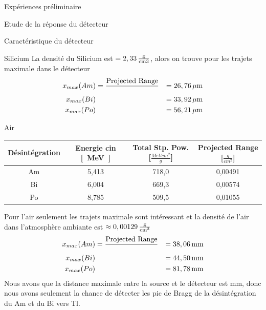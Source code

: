 \documentclass[a4paper,11pt,liststotocnumbered,bibtotocnumbered]{scrartcl}
\begin{document}
\begin{section}{Expériences préliminaire}
\begin{subsection}{Etude de la réponse du détecteur}
\begin{subsubsection}{Caractéristique du détecteur}
\begin{paragraph}{Silicium}
    La densité du Silicium \cite{wikisi} est $\rho=\unit[2,33]{\frac{g}{cm3}}$, alors on trouve pour les trajets maximale dans le détecteur
    \begin{eqnarray*}
     x_{max}(Am)&=\frac{\text{Projected Range}}{\rho}&=\unit[26,76]{\mu m}\\
     x_{max}(Bi)&&=\unit[33,92]{\mu m}\\
     x_{max}(Po)&&=\unit[56,21]{\mu m}
    \end{eqnarray*}
   \end{paragraph}
   \begin{paragraph}{Air}
    \begin{center}
     \begin{tabular}{c|c|c|c}
      Désintégration & Energie cin \unit{[MeV]} & Total Stp. Pow. [$\frac{MeV cm^2}{g}$] & Projected Range [$\frac{g}{cm^2}$] \\ \hline
      Am & 5,413 & 718,0 & 0,00491 \\ 
      Bi & 6,004 & 669,3 & 0,00574 \\ 
      Po & 8,785 & 509,5 & 0,01055 \\ 
     \end{tabular}
    \end{center}
    Pour l'air seulement les trajets maximale sont intéressant et la densité de l'air dans l'atmosphère ambiante est $\rho\approx\unit[0,00129]{\frac{g}{cm^3}}$
    \begin{eqnarray*}
     x_{max}(Am)&=\frac{\text{Projected Range}}{\rho}&=\unit[38,06]{mm}\\
     x_{max}(Bi)&&=\unit[44,50]{mm}\\
     x_{max}(Po)&&=\unit[81,78]{mm}
    \end{eqnarray*}
    Nous avons que la distance maximale entre la source et le détecteur est \unit[45]{mm}, donc nous avons seulement la chance de détecter les pic de Bragg de la désintégration du Am et du Bi vers Tl.
   \end{paragraph}
   \end{subsubsection}


\end{subsection}
\end{section}
\end{document}
